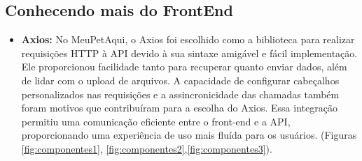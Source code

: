 \subsection{Conhecendo mais do FrontEnd}
\begin{itemize}
\item {\bf Axios:} No MeuPetAqui, o Axios foi escolhido como a biblioteca para realizar requisições HTTP à API devido à sua sintaxe amigável e fácil implementação. Ele proporcionou facilidade tanto para recuperar quanto enviar dados, além de lidar com o upload de arquivos. A capacidade de configurar cabeçalhos personalizados nas requisições e a assincronicidade das chamadas também foram motivos que contribuíram para a escolha do Axios. Essa integração permitiu uma comunicação eficiente entre o front-end e a API, proporcionando uma experiência de uso mais fluída para os usuários. (Figuras \ref{fig:componentes1}, \ref{fig:componentes2},\ref{fig:componentes3}).


\end{itemize}
